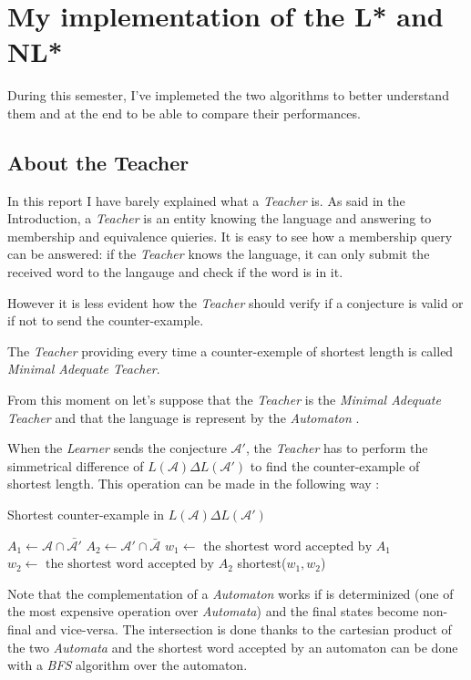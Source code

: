 \section{My implementation of the L* and NL*}
During this semester, I've implemeted the two algorithms to better understand them and at the end to be able to compare their performances.

\subsection{About the Teacher}
In this report I have barely explained what a \textit{Teacher} is. As said in the Introduction, a \textit{Teacher} is an entity knowing the language and answering to membership and equivalence quieries. It is easy to see how a membership query can be answered: if the \textit{Teacher} knows the language, it can only submit the received word to the langauge and check if the word is in it.

However it is less evident how the \textit{Teacher} should verify if a conjecture is valid or if not to send the counter-example.
\begin{definition}
  The \textit{Teacher} providing every time a counter-exemple of shortest length is called \textit{Minimal Adequate Teacher}.
\end{definition}

From this moment on let's suppose that the \textit{Teacher} is the \textit{Minimal Adequate Teacher} and that the language is represent by the \textit{Automaton} \automaton{}.

When the \textit{Learner} sends the conjecture $\mathcal{A}'$, the \textit{Teacher} has to perform the simmetrical difference of $L(\mathcal{A}) \Delta L(\mathcal{A'})$ to find the counter-example of shortest length. This operation can be made in the following way :

\begin{algorithm}
  \caption{Shortest counter-example in $L(\mathcal{A}) \Delta L(\mathcal{A'})$}
  $A_1 \gets \mathcal{A} \cap \bar{\mathcal{A'}}$\;
  $A_2 \gets \mathcal{A'} \cap \bar{\mathcal{A}}$\;
  $w_1 \gets \text{ the shortest word accepted by } A_1$\;
  $w_2 \gets \text{ the shortest word accepted by } A_2$\;
  \Return shortest($w_1, w_2$)\;
\end{algorithm}

Note that the complementation of a \textit{Automaton} \automaton{} works if \automaton{} is determinized (one of the most expensive operation over \textit{Automata}) and the final states become non-final and vice-versa. The intersection is done thanks to the cartesian product of the two \textit{Automata} and the shortest word accepted by an automaton can be done with a \textit{BFS} algorithm over the automaton.

